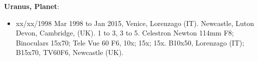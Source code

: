 {\bf Uranus, Planet}:
\begin{itemize}
\item xx/xx/1998 Mar 1998 to Jan 2015, Venice, Lorenzago (IT). Newcastle, Luton Devon, Cambridge, (UK). 1 to 3, 3 to 5. Celestron Newton 114mm F8; Binoculars 15x70; Tele Vue 60 F6, 10x; 15x; 15x. B10x50, Lorenzago (IT); B15x70, TV60F6, Newcastle (UK).
\end{itemize}
